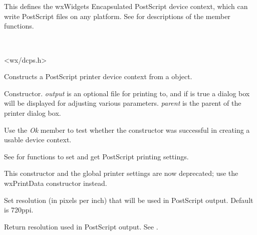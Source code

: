 \section{}\label{wxpostscriptdc}

This defines the wxWidgets Encapsulated PostScript device context,
which can write PostScript files on any platform. See  for
descriptions of the member functions.


\\


<wx/dcps.h>


\label{wxpostscriptdcctor}


Constructs a PostScript printer device context from a  object.


Constructor. {\it output} is an optional file for printing to, and if
 is true a dialog box will be displayed for adjusting
various parameters. {\it parent} is the parent of the printer dialog box.

Use the {\it Ok} member to test whether the constructor was successful
in creating a usable device context.

See  for functions to set and
get PostScript printing settings.

This constructor and the global printer settings are now deprecated;
use the wxPrintData constructor instead.


\label{wxpostscriptdcsetresolution}


Set resolution (in pixels per inch) that will be used in PostScript
output. Default is 720ppi.

\label{wxpostscriptdcgetresolution}


Return resolution used in PostScript output. See 
.

